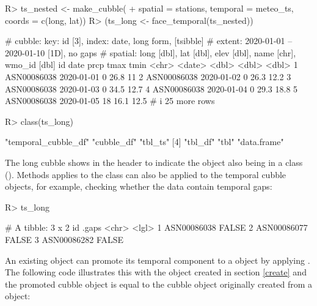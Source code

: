 \documentclass[
  shortnames]{jss}
\begin{document}
\begin{CodeChunk}
\begin{CodeInput}
R> ts_nested <- make_cubble(
+   spatial = stations, temporal = meteo_ts, coords = c(long, lat))
R> (ts_long <- face_temporal(ts_nested))
\end{CodeInput}
\begin{CodeOutput}
# cubble:  key: id [3], index: date, long form, [tsibble]
# extent:  2020-01-01 -- 2020-01-10 [1D], no gaps
# spatial: long [dbl], lat [dbl], elev [dbl], name [chr], wmo_id [dbl]
  id          date        prcp  tmax  tmin
  <chr>       <date>     <dbl> <dbl> <dbl>
1 ASN00086038 2020-01-01     0  26.8  11  
2 ASN00086038 2020-01-02     0  26.3  12.2
3 ASN00086038 2020-01-03     0  34.5  12.7
4 ASN00086038 2020-01-04     0  29.3  18.8
5 ASN00086038 2020-01-05    18  16.1  12.5
# i 25 more rows
\end{CodeOutput}
\begin{CodeInput}
R> class(ts_long)
\end{CodeInput}
\begin{CodeOutput}
[1] "temporal_cubble_df" "cubble_df"          "tbl_ts"            
[4] "tbl_df"             "tbl"                "data.frame"        
\end{CodeOutput}
\end{CodeChunk}

The long cubble shows \code{[tsibble]} in the header to indicate the object also being in a  class (). Methods applies to the  class can also be applied to the temporal cubble objects, for example, checking whether the data contain temporal gaps:

\begin{CodeChunk}
\begin{CodeInput}
R> ts_long %
\end{CodeInput}
\begin{CodeOutput}
# A tibble: 3 x 2
  id          .gaps
  <chr>       <lgl>
1 ASN00086038 FALSE
2 ASN00086077 FALSE
3 ASN00086282 FALSE
\end{CodeOutput}
\end{CodeChunk}

An existing  object can promote its temporal component to a  object by applying . The following code illustrates this with the object  created in section \ref{create} and the promoted cubble object is equal to the cubble object originally created from a  object:
\end{document}
